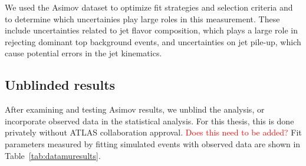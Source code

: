 We used the Asimov dataset to optimize fit strategies and selection criteria and to determine which uncertainies play large roles in this measurement. These include uncertainties related to jet flavor composition, which plays a large role in rejecting dominant top background events, and uncertainties on jet pile-up, which cause potential errors in the jet kinematics.

\subsection{Unblinded results}

After examining and testing Asimov results, we unblind the analysis, or incorporate observed data in the statistical analysis. For this thesis, this is done privately without ATLAS collaboration approval. \textcolor{red}{Does this need to be added?} Fit parameters measured by fitting simulated events with observed data are shown in Table~\ref{tab:datamuresults}. 

